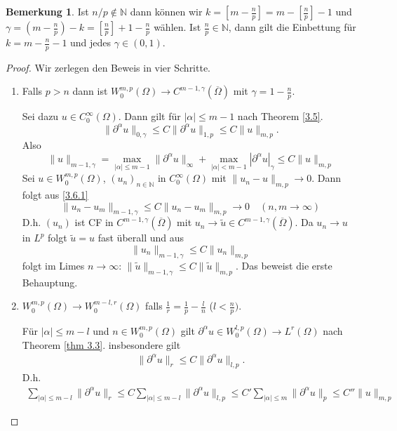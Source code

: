 \documentclass[
paper=a4,
bibtotocnumbered,
liststotocnumbered,
tablecaptionabove,
pointlessnumbers,
twoside,
openright,
10pt
]
{report}
\theoremstyle{definition}
\newtheorem*{rem}{Bemerkung}
\numberwithin{equation}{chapter}
\begin{document}
\begin{rem}
Ist $n/p \not\in \mathbb N$ dann können wir $k=\left [m-\frac{n}{p}\right ] = m- \left [\frac{n}{p}\right ] -1$ und $\gamma = \left ( m- \frac{n}{p} \right )-k = \left [\frac{n}{p} \right ]+1 - \frac{n}{p}$ wählen.
Ist $\frac{n}{p}\in \mathbb N$, dann gilt die Einbettung für $k=m-\frac{n}{p}-1$ und jedes $\gamma \in (0,1)$.
\end{rem}
 \begin{proof} Wir zerlegen den Beweis in vier Schritte.
 \begin{enumerate}
 	\item Falls $p>n$ dann ist $W_0^{m,p}(\Omega) \to C^{m-1, \gamma} (\overline\Omega)$ mit $\gamma = 1- \frac{n}{p}$.
 	
		Sei dazu $u\in C_0^\infty(\Omega)$. Dann gilt für $|\alpha|\le m-1$ nach Theorem \ref{3.5}.
		\begin{equation}
			\|\partial^\alpha u\|_{0,\gamma} \le C \| \partial^\alpha u\|_{1,p} \le C\| u \|_{m,p}.
		\end{equation}
		Also
		\begin{equation}\label{3.6.1}
			\|u\|_{m-1,\gamma} = \max_{|\alpha|\le m-1} \| \partial^\alpha u \|_\infty + \max_{|\alpha| < m-1} | \partial^\alpha u|_\gamma \le C\| u \|_{m,p}
		\end{equation}
		Sei $u\in W_0^{m,p}(\Omega)$, $(u_n)_{n \in \mathbb{N}}$ in $C_0^\infty(\Omega)$ mit $\| u_n - u\|_{m,p} \to 0$. Dann folgt aus \eqref{3.6.1}
		\begin{equation}
			\| u_n - u_m \|_{m-1, \gamma} \le C \| u_n - u_m \|_{m,p} \to 0 \quad (n,m\to \infty)
		\end{equation}
		D.h. $(u_n)$ ist CF in $C^{m-1, \gamma}(\overline{\Omega})$ mit $u_n \to \tilde u \in C^{m-1, \gamma}(\overline{\Omega})$. Da $u_n \to u$ in $L^p$ folgt $\tilde u = u$ fast überall und aus
		\begin{equation}
			\| u_n \|_{m-1, \gamma} \le C \| u_n \|_{m,p}
		\end{equation}
		folgt im Limes $n\to \infty$: $\| \tilde u\|_{m-1, \gamma} \le C\| \tilde u \|_{m,p}$. Das beweist die erste Behauptung.
 	
 \item $W_0^{m,p}(\Omega) \to W_0^{m-l,r}(\Omega)$ falls $\frac{1}{r} = \frac{1}{p} - \frac{l}{n}$ ($l < \frac{n}{p})$.
	
		Für $|\alpha|\le m-l$ und $n\in W_0^{m,p}(\Omega)$ gilt $\partial^\alpha u \in W_0^{l,p}(\Omega) \to L^r(\Omega)$ nach Theorem \ref{thm 3.3}. insbesondere gilt
		\begin{align*}
			\|\partial^\alpha u \|_r \le C\| \partial ^\alpha u\|_{l,p}.
			\end{align*}
			D.h.
			\begin{align*}
			\sum_{|\alpha|\le m-l} \|\partial^\alpha u \|_r  \le C\sum_{|\alpha|\le m-l} \| \partial^\alpha u\|_{l,p}\le C' \sum_{|\alpha | \le m} \| \partial^\alpha u \|_p \le C'' \| u\|_{m,p} 
			\end{align*}
										 

\end{enumerate}
\end{proof}
\end{document}

